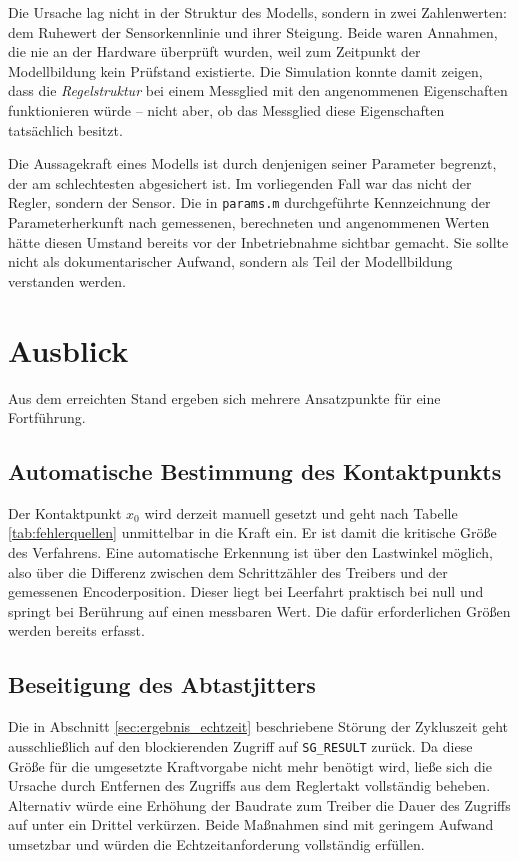 Die Ursache lag nicht in der Struktur des Modells, sondern in zwei Zahlenwerten: dem
Ruhewert der Sensorkennlinie und ihrer Steigung. Beide waren Annahmen, die nie an der
Hardware überprüft wurden, weil zum Zeitpunkt der Modellbildung kein Prüfstand existierte.
Die Simulation konnte damit zeigen, dass die \emph{Regelstruktur} bei einem Messglied mit
den angenommenen Eigenschaften funktionieren würde -- nicht aber, ob das Messglied diese
Eigenschaften tatsächlich besitzt.

Die Aussagekraft eines Modells ist durch denjenigen seiner Parameter begrenzt, der am
schlechtesten abgesichert ist. Im vorliegenden Fall war das nicht der Regler, sondern der
Sensor. Die in \texttt{params.m} durchgeführte Kennzeichnung der Parameterherkunft nach
gemessenen, berechneten und angenommenen Werten hätte diesen Umstand bereits vor der
Inbetriebnahme sichtbar gemacht. Sie sollte nicht als dokumentarischer Aufwand, sondern
als Teil der Modellbildung verstanden werden.

\section{Ausblick}

Aus dem erreichten Stand ergeben sich mehrere Ansatzpunkte für eine Fortführung.

\subsection*{Automatische Bestimmung des Kontaktpunkts}

Der Kontaktpunkt $x_0$ wird derzeit manuell gesetzt und geht nach Tabelle
\ref{tab:fehlerquellen} unmittelbar in die Kraft ein. Er ist damit die kritische Größe des
Verfahrens. Eine automatische Erkennung ist über den Lastwinkel möglich, also über die
Differenz zwischen dem Schrittzähler des Treibers und der gemessenen Encoderposition.
Dieser liegt bei Leerfahrt praktisch bei null und springt bei Berührung auf einen
messbaren Wert. Die dafür erforderlichen Größen werden bereits erfasst.

\subsection*{Beseitigung des Abtastjitters}

Die in Abschnitt \ref{sec:ergebnis_echtzeit} beschriebene Störung der Zykluszeit geht
ausschließlich auf den blockierenden Zugriff auf \texttt{SG\_RESULT} zurück. Da diese
Größe für die umgesetzte Kraftvorgabe nicht mehr benötigt wird, ließe sich die Ursache
durch Entfernen des Zugriffs aus dem Reglertakt vollständig beheben. Alternativ würde eine
Erhöhung der Baudrate zum Treiber die Dauer des Zugriffs auf unter ein Drittel verkürzen.
Beide Maßnahmen sind mit geringem Aufwand umsetzbar und würden die Echtzeitanforderung
vollständig erfüllen.


